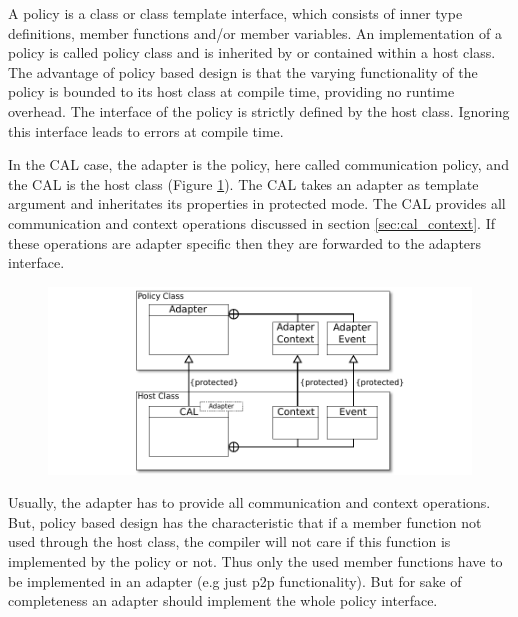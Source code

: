  A policy is a class or class template interface, which consists of
  inner type definitions, member functions and/or member variables. An
  implementation of a policy is called policy class and is inherited
  by or contained within a host class.  The advantage of policy based
  design is that the varying functionality of the policy is bounded to
  its host class at compile time, providing no runtime overhead. 
  The interface of the policy is strictly defined by the host
  class. Ignoring this interface leads to errors at compile time.

  In the CAL case, the adapter is the policy, here called
  communication policy, and the CAL is the host class (Figure
  \ref{fig:cal_uml}). The CAL takes an adapter as template argument
  and inheritates its properties in protected mode. The CAL provides
  all communication and context operations discussed in section
  \ref{sec:cal_context}. If these operations are adapter specific then
  they are forwarded to the adapters interface.


  \begin{figure}[H]
    \centering \includegraphics[width=\textwidth]{graphics/40_cal_uml}
    \caption{  }
    \label{fig:cal_uml}
  \end{figure}

  Usually, the adapter has to provide all communication and context
  operations. But, policy based design has the characteristic
  that if a member function not used through the host class, the
  compiler will not care if this function is implemented by the policy
  or not. Thus only the used member functions have to be implemented
  in an adapter (e.g just p2p functionality). But for sake of
  completeness an adapter should implement the whole policy interface.

